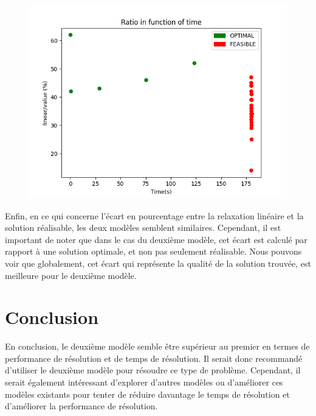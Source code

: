 \documentclass[10pt]{article}
\begin{document}
\begin{figure}
  \centering
  \includegraphics[max width=\textwidth]{FH7W_HOUq0cJPP4pauJ7B-iXxNQurcsuVAkoylhbvhU_original_fullsize}
\end{figure}

Enfin, en ce qui concerne l'écart en pourcentage entre la relaxation linéaire et la solution réalisable, les deux modèles semblent similaires. Cependant, il est important de noter que dans le cas du deuxième modèle, cet écart est calculé par rapport à une solution optimale, et non pas seulement réalisable.
Nous pouvons voir que globalement, cet écart qui représente la qualité de la solution trouvée, est meilleure pour le deuxième modèle.
\section*{Conclusion}
En conclusion, le deuxième modèle semble être supérieur au premier en termes de performance de résolution et de temps de résolution. Il serait donc recommandé d'utiliser le deuxième modèle pour résoudre ce type de problème. Cependant, il serait également intéressant d'explorer d'autres modèles ou d'améliorer ces modèles existants pour tenter de réduire davantage le temps de résolution et d'améliorer la performance de résolution.
\end{document}
